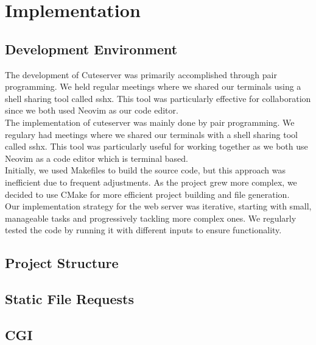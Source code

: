 \section*{Implementation}

\subsection*{Development Environment} 
The development of Cuteserver was primarily accomplished through pair programming. We held regular meetings where we shared our terminals using a shell sharing tool called sshx. This tool was particularly effective for collaboration since we both used Neovim as our code editor. \\

The implementation of cuteserver was mainly done by pair programming. We regulary had meetings where we shared our terminals with a shell sharing tool called sshx. This tool was particularly useful for working together as we both use Neovim as a code editor which is terminal based. \\ %

Initially, we used Makefiles to build the source code, but this approach was inefficient due to frequent adjustments. As the project grew more complex, we decided to use CMake for more efficient project building and file generation. \\

Our implementation strategy for the web server was iterative, starting with small, manageable tasks and progressively tackling more complex ones. We regularly tested the code by running it with different inputs to ensure functionality.


\subsection*{Project Structure} %

\subsection*{Static File Requests}

\subsection*{CGI}

